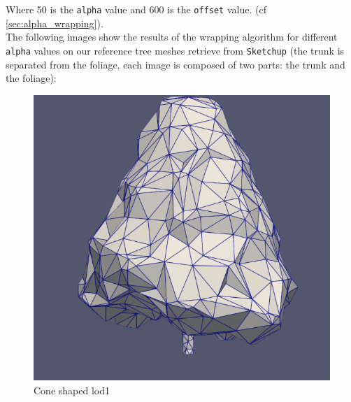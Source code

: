 \documentclass[12pt]{article}
\begin{document}
Where 50 is the \texttt{alpha} value and 600 is the \texttt{offset} value. 
(cf \autoref{sec:alpha_wrapping}). \\

The following images show the results of the wrapping algorithm for different
\texttt{alpha} values on our reference tree meshes retrieve from \texttt{Sketchup}
(the trunk is separated from the foliage, each image is composed of two parts: 
the trunk and the foliage):


\begin{figure}[H]
    \centering
    \begin{minipage}{0.30\textwidth}
        \centering
        \includegraphics[width=1\textwidth]{images/tree-cone_lod1.png}
        \caption{Cone shaped lod1}
    \end{minipage}
    \begin{minipage}{0.30\textwidth}
        \centering

\end{minipage}
\end{figure}
\end{document}
